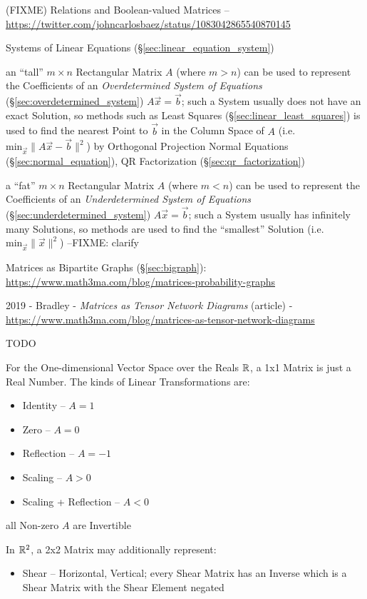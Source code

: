 (FIXME) Relations and Boolean-valued Matrices --
\url{https://twitter.com/johncarlosbaez/status/1083042865540870145}


Systems of Linear Equations (\S\ref{sec:linear_equation_system})

an ``tall'' $m \times n$ Rectangular Matrix $A$ (where $m > n$) can be used to
represent the Coefficients of an \emph{Overdetermined System of Equations}
(\S\ref{sec:overdetermined_system}) $A\vec{x} = \vec{b}$; such a System usually
does not have an exact Solution, so methods such as Least Squares
(\S\ref{sec:linear_least_squares}) is used to find the nearest Point to
$\vec{b}$ in the Column Space of $A$ (i.e.  $\mathrm{min}_{\vec{x}} \|A\vec{x} -
\vec{b}\|^2$) by Orthogonal Projection \fist Normal Equations
(\S\ref{sec:normal_equation}), QR Factorization (\S\ref{sec:qr_factorization})

a ``fat'' $m \times n$ Rectangular Matrix $A$ (where $m < n$) can be used to
represent the Coefficients of an \emph{Underdetermined System of Equations}
(\S\ref{sec:underdetermined_system}) $A\vec{x} = \vec{b}$; such a System
usually has infinitely many Solutions, so methods are used to find the
``smallest'' Solution (i.e. $\mathrm{min}_{\vec{x}} \|\vec{x}\|^2$)
--FIXME: clarify

Matrices as Bipartite Graphs (\S\ref{sec:bigraph}):
\url{https://www.math3ma.com/blog/matrices-probability-graphs}

2019 - Bradley - \emph{Matrices as Tensor Network Diagrams} (article) -
\url{https://www.math3ma.com/blog/matrices-as-tensor-network-diagrams}

\asterism

TODO

For the One-dimensional Vector Space over the Reals $\mathbb{R}$, a 1x1 Matrix is
just a Real Number. The kinds of Linear Transformations are:
\begin{itemize}
  \item Identity -- $A = 1$
  \item Zero -- $A = 0$
  \item Reflection -- $A = -1$
  \item Scaling -- $A > 0$
  \item Scaling + Reflection -- $A < 0$
\end{itemize}
all Non-zero $A$ are Invertible

In $\mathbb{R}^2$, a 2x2 Matrix may additionally represent:
\begin{itemize}
  \item Shear -- Horizontal, Vertical; every Shear Matrix has an Inverse which
    is a Shear Matrix with the Shear Element negated
\end{itemize}



